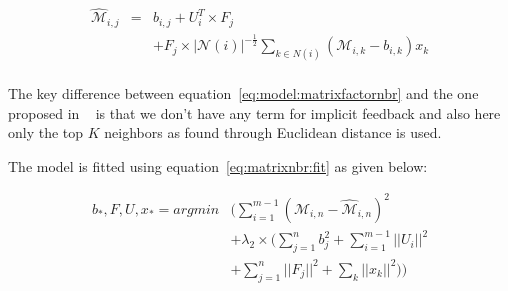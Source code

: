 \begin{equation}
  \label{eq:model:matrixfactornbr}
  \begin{array}{lcl}
    \widehat{\mathcal{M}}_{i,j} & = &  b_{i,j} + U_i^T\times F_j \\
                                &   & + F_j \times |\mathcal{N}(i)|^{-\frac{1}{2}}\sum_{k \in N(i)} (\mathcal{M}_{i,k} - b_{i,k}) x_k \\
  \end{array}
\end{equation}

The key difference between equation~\ref{eq:model:matrixfactornbr} and the one proposed in 
~\cite{koren2008factor} is that we don't have any term for implicit feedback and also here 
only the top $K$ neighbors as found through Euclidean distance is used. 

The model is fitted using equation~\ref{eq:matrixnbr:fit} as given below:

\begin{equation}
  \label{eq:matrixnbr:fit}
  \begin{array}{ll}
    b_*, F, U, x_*  = argmin &(\sum \limits_{i=1}^{m-1} \left(\mathcal{M}_{i,n} - \widehat{\mathcal{M}}_{i,n}   \right)^2 \\
                    & + \lambda_2\times(\sum \limits_{j=1}^{n}b_j^2 + \sum \limits_{i=1}^{m-1} || U_i||^2 \\
                    & + \sum \limits_{j=1}^{n} || F_j||^2 + \sum_k ||x_k||^2))
  \end{array}
  \end{equation}


